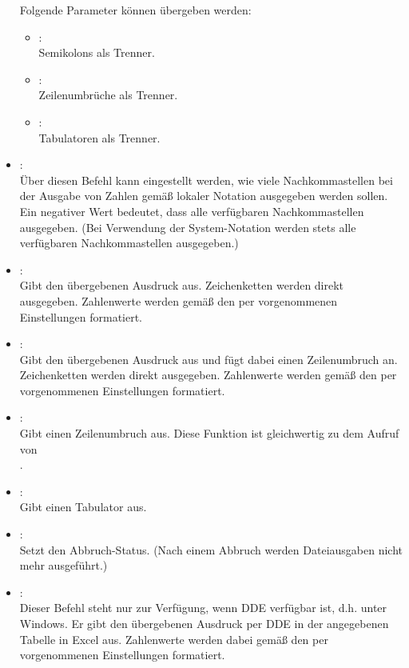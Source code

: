 \begin{itemize}
Folgende Parameter können  übergeben werden:
\begin{itemize}
\item
{}:\\
Semikolons als Trenner.
\item
{}:\\
Zeilenumbrüche als Trenner.
\item
{}:\\
Tabulatoren als Trenner.
\end{itemize}

\item
{}:\\
Über diesen Befehl kann eingestellt werden, wie viele Nachkommastellen bei der
Ausgabe von Zahlen gemäß lokaler Notation ausgegeben werden sollen. Ein
negativer Wert bedeutet, dass alle verfügbaren Nachkommastellen ausgegeben.
(Bei Verwendung der System-Notation werden stets alle verfügbaren Nachkommastellen ausgegeben.)

\item
{}:\\
Gibt den übergebenen Ausdruck aus.
Zeichenketten werden direkt ausgegeben. Zahlenwerte werden gemäß den per
 vorgenommenen Einstellungen formatiert.

\item
{}:\\
Gibt den übergebenen Ausdruck aus und fügt dabei einen Zeilenumbruch an.
Zeichenketten werden direkt ausgegeben. Zahlenwerte werden gemäß den per
 vorgenommenen Einstellungen formatiert.

\item
{}:\\
Gibt einen Zeilenumbruch aus. Diese Funktion ist gleichwertig zu dem Aufruf von\\
.

\item
{}:\\
Gibt einen Tabulator aus.

\item
{}:\\
Setzt den Abbruch-Status. (Nach einem Abbruch werden Dateiausgaben nicht mehr ausgeführt.)

\item
{}:\\
Dieser  Befehl steht nur zur Verfügung, wenn DDE verfügbar ist, d.h. unter Windows.
Er gibt den übergebenen Ausdruck per DDE in der angegebenen Tabelle in Excel aus.
Zahlenwerte werden dabei gemäß den per  vorgenommenen Einstellungen formatiert.

\end{itemize}



